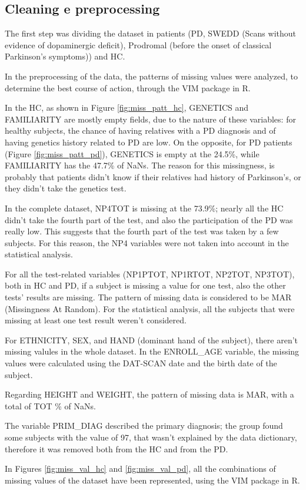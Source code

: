 \documentclass[]{article}
\begin{document}
\begin{multicols}{2}
\subsection{Cleaning e preprocessing}

The first step was dividing the dataset in patients (PD, SWEDD (Scans without evidence of dopaminergic deficit), Prodromal (before the onset of classical Parkinson's symptoms)) and HC.

In the preprocessing of the data, the patterns of missing values were analyzed, to determine the best course of action, through the VIM package in R.

In the HC, as shown in Figure \ref{fig:miss_patt_hc}, GENETICS and FAMILIARITY are mostly empty fields, due to the nature of these variables: for healthy subjects, the chance of having relatives with a PD diagnosis and of having genetics history related to PD are low. On the opposite, for PD patients (Figure \ref{fig:miss_patt_pd}), GENETICS is empty at the 24.5\%, while FAMILIARITY has the 47.7\% of NaNs. The reason for this missingness, is probably that patients didn't know if their relatives had history of Parkinson's, or they didn't take the genetics test. 

In the complete dataset, NP4TOT is missing at the 73.9\%; nearly all the HC didn't take the fourth part of the test, and also the participation of the PD was really low. This suggests that the fourth part of the test was taken by a few subjects. For this reason, the NP4 variables were not taken into account in the statistical analysis.

For all the test-related variables (NP1PTOT, NP1RTOT, NP2TOT, NP3TOT), both in HC and PD, if a subject is missing a value for one test, also the other tests' results are missing. The pattern of missing data is considered to be MAR (Missingness At Random). For the statistical analysis, all the subjects that were missing at least one test result weren't considered.  

For ETHNICITY, SEX, and HAND (dominant hand of the subject), there aren't missing valules in the whole dataset. In the ENROLL\_AGE variable, the missing values were calculated using the DAT-SCAN date and the birth date of the subject.

Regarding HEIGHT and WEIGHT, the pattern of missing data is MAR, with a total of TOT \% of NaNs. 

The variable PRIM\_DIAG described the primary diagnosis; the group found some subjects with the value of 97, that wasn't explained by the data dictionary, therefore it was removed both from the HC and from the PD. 

In Figures \ref{fig:miss_val_hc} and \ref{fig:miss_val_pd}, all the combinations of missing values of the dataset have been represented, using the VIM package in R.
\end{multicols}
\end{document}
